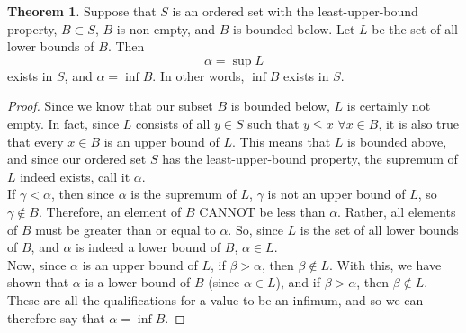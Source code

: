 \documentclass{article}
\theoremstyle{definition}
\newtheorem{theorem}{Theorem}[section]
\begin{document}
\begin{section}
\begin{theorem}
Suppose that $S$ is an ordered set with the least-upper-bound property, $B \subset S$, $B$ is non-empty, and $B$ is bounded below. Let $L$ be the set of all lower bounds of $B$. Then \[ \alpha = \sup L\]exists in $S$, and $\alpha = \inf B$. In other words, $\inf B$ exists in $S$.
\end{theorem}

\begin{proof}
Since we know that our subset $B$ is bounded below, $L$ is certainly not empty. In fact, since $L$ consists of all $y \in S$ such that $y \leq x$ $\forall x \in B$, it is also true that every $x \in B$ is an upper bound of $L$. This means that $L$ is bounded above, and since our ordered set $S$ has the least-upper-bound property, the supremum of $L$ indeed exists, call it $\alpha$. \\
If $\gamma < \alpha$, then since $\alpha$ is the supremum of $L$, $\gamma$ is not an upper bound of $L$, so $\gamma \notin B$. Therefore, an element of $B$ CANNOT be less than $\alpha$. Rather, all elements of $B$ must be greater than or equal to $\alpha$. So, since $L$ is the set of all lower bounds of $B$, and $\alpha$ is indeed a lower bound of $B$, $\alpha \in L$. \\
Now, since $\alpha$ is an upper bound of $L$, if $\beta > \alpha$, then $\beta \notin L$. With this, we have shown that $\alpha$ is a lower bound of $B$ (since $\alpha \in L$), and if $\beta > \alpha$, then $\beta \notin L$. These are all the qualifications for a value to be an infimum, and so we can therefore say that $\alpha = \inf B$.
\end{proof}

\end{section}

 
 
 
\end{document}
